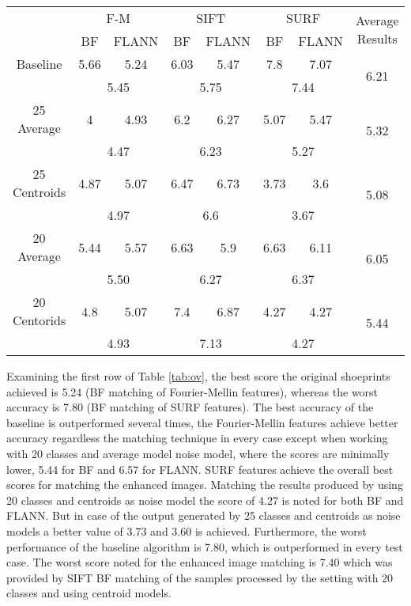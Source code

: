 \documentclass[draft,final]{vutinfth} %
\begin{document}
\begin{minipage}{\linewidth}
\centering
\centering
\begin{tabular}{cccccccc}
& \multicolumn{2}{c}{ F-M } & \multicolumn{2}{c}{ SIFT } & \multicolumn{2}{c}{ SURF } & \multirow{2}{*}{ Average Results } \\
& BF & FLANN & BF & FLANN & BF & FLANN & \\
Baseline & 5.66 & 5.24 & 6.03 & 5.47 & 7.8 & 7.07 & \multirow{2}{*}{ 6.21 } \\
& \multicolumn{2}{c}{ 5.45 } & \multicolumn{2}{c}{ 5.75 } & \multicolumn{2}{c}{ 7.44 } & \\
25 Average & 4 & 4.93 & 6.2 & 6.27 & 5.07 & 5.47 & \multirow{2}{*}{ 5.32 } \\
& \multicolumn{2}{c}{ 4.47 } & \multicolumn{2}{c}{ 6.23 } & \multicolumn{2}{c}{ 5.27 } & \\
25 Centroids & 4.87 & 5.07 & 6.47 & 6.73 & 3.73 & 3.6 & \multirow{2}{*}{ 5.08 } \\
& \multicolumn{2}{c}{ 4.97 } & \multicolumn{2}{c}{ 6.6 } & \multicolumn{2}{c}{ 3.67 } & \\
20 Average & 5.44 & 5.57 & 6.63 & 5.9 & 6.63 & 6.11 & \multirow{2}{*}{ 6.05 } \\
& \multicolumn{2}{c}{ 5.50 } & \multicolumn{2}{c}{ 6.27 } & \multicolumn{2}{c}{ 6.37 } & \\
20 Centorids & 4.8 & 5.07 & 7.4 & 6.87 & 4.27 & 4.27 & \multirow{2}{*}{ 5.44 } \\
& \multicolumn{2}{c}{ 4.93 } & \multicolumn{2}{c}{ 7.13 } & \multicolumn{2}{c}{ 4.27 } & \\
\end{tabular}
 \label{tab:ov} 
\end{minipage}


\par
Examining the first row of Table \ref{tab:ov}, the best score the original shoeprints achieved is 5.24 (BF matching of Fourier-Mellin features), whereas the worst accuracy is 7.80 (BF matching of SURF features).
The best accuracy of the baseline is outperformed several times, the Fourier-Mellin features achieve better accuracy regardless the matching technique in every case except when working with 20 classes and average model noise model, where the scores are minimally lower, 5.44 for BF and 6.57 for FLANN.
SURF features achieve the overall best scores for matching the enhanced images.
Matching the results produced by using 20 classes and centroids as noise model the score of 4.27 is noted for both BF and FLANN.
But in case of the output generated by 25 classes and centroids as noise models a better value of 3.73 and 3.60 is achieved.
Furthermore, the worst performance of the baseline algorithm is 7.80, which is outperformed in every test case.
The worst score noted for the enhanced image matching is 7.40 which was provided by SIFT BF matching of the samples processed by the setting with 20 classes and using centroid models.
\end{document}
